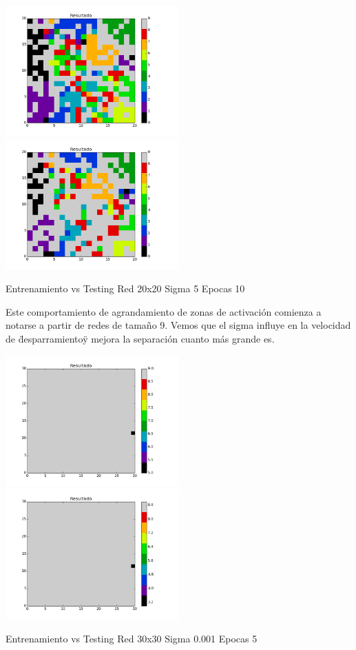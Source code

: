\includegraphics[width=0.5\textwidth]{img/EJ2_Sigma/train_M_20_sigma_5_0_epocas_5}
\includegraphics[width=0.5\textwidth]{img/EJ2_Sigma/test_M_20_sigma_5_0_epocas_5}
{\center \footnotesize Entrenamiento vs Testing Red 20x20 Sigma 5 Epocas 10\par}

Este comportamiento de agrandamiento de zonas de activaci\'on comienza a notarse a partir de redes de tama\~no 9. Vemos que el sigma influye en la velocidad de \"desparramiento\" y mejora la separaci\'on cuanto m\'as grande es.

\includegraphics[width=0.5\textwidth]{img/EJ2_Sigma/train_M_30_sigma_0_001_epocas_5}
\includegraphics[width=0.5\textwidth]{img/EJ2_Sigma/test_M_30_sigma_0_001_epocas_5}
{\center \footnotesize Entrenamiento vs Testing Red 30x30 Sigma 0.001 Epocas 5\par}

